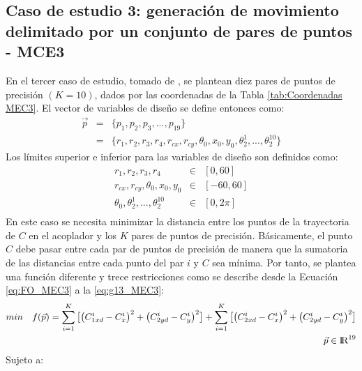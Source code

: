 \subsection{Caso de estudio 3: generación de movimiento delimitado por un conjunto de pares de puntos - MCE3}
En el tercer caso de estudio, tomado de \cite{Portilla_Mezura_MEC3}, se plantean diez pares de puntos de precisión $(K = 10)$, dados por las coordenadas de la Tabla \ref{tab:Coordenadas MEC3}. El vector de variables de diseño se define entonces como:
\begin{eqnarray}\label{eq:Vector variables MEC1}
\vec{p} &=& \{p_1,p_2,p_3,...,p_{19} \}\\
       &=& \{ r_1,r_2,r_3,r_4,r_{cx},r_{cy},\theta_0,x_0,y_0,\theta^1_2,...,\theta^{10}_2 \} 
\end{eqnarray}
Los límites superior e inferior para las variables de diseño son definidos como:
\begin{eqnarray}\label{eq:limites variables MEC3}
r_1,r_2,r_3,r_4& \in & \left[ 0,60\right] \\
r_{cx},r_{cy},\theta_0,x_0,y_0 & \in & \left[ -60,60\right] \\
\theta_0,\theta^1_2,...,\theta^{10}_2& \in & \left[ 0,2\pi \right] \\
\end{eqnarray}
 En este caso se necesita minimizar la distancia entre los puntos de la trayectoria de $C$ en el acoplador y los $K$ pares de puntos de precisión. Básicamente, el punto $C$ debe pasar entre cada par de puntos de precisión de manera que la sumatoria de las distancias entre cada punto del par $i$ y $C$ sea mínima. Por tanto, se plantea una función diferente y trece restricciones como se describe desde la Ecuación \ref{eq:FO_MEC3} a la \ref{eq:g13_MEC3}:
 \begin{equation}\label{eq:FO_MEC3}
 \begin{aligned}
min\quad  f(\vec{p})=
\sum_{i=1}^{K}\big[\big(C^{i}_{1xd}-C^{i}_{x} \big)^2 +\big(C^{i}_{2yd}-C^{i}_{y} \big)^2\big]+\sum_{i=1}^{K}\big[\big(C^{i}_{2xd}-C^{i}_{x} \big)^2 +\big(C^{i}_{2yd}-C^{i}_{y} \big)^2\big]
\\
\vec{p} \in  {\rm I\!R}^{19}
\end{aligned}
\end{equation}
Sujeto a:
